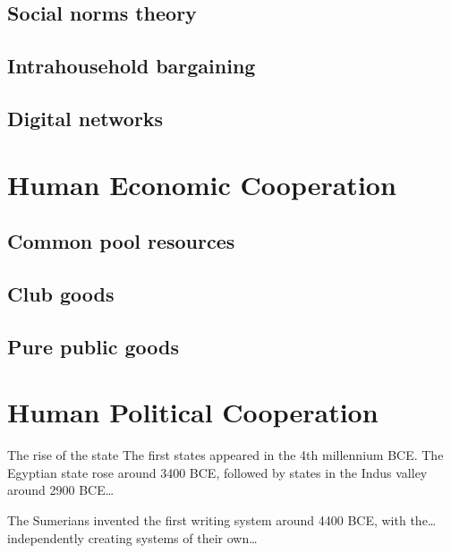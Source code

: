 \documentclass{tufte-book} %
\begin{document}
\section{Social norms theory}

\section{Intrahousehold bargaining}

\section{Digital networks}


\chapter{Human Economic Cooperation}\label{econ-coop}

\section{Common pool resources}

\section{Club goods}

\section{Pure public goods}


\chapter{Human Political Cooperation}\label{poli-coop}

The rise of the state
The first states appeared in the 4th millennium BCE. The Egyptian state rose around 3400 BCE, followed by states in the Indus valley around 2900 BCE…

The Sumerians invented the first writing system around 4400 BCE, with the…independently creating systems of their own…
\end{document}
